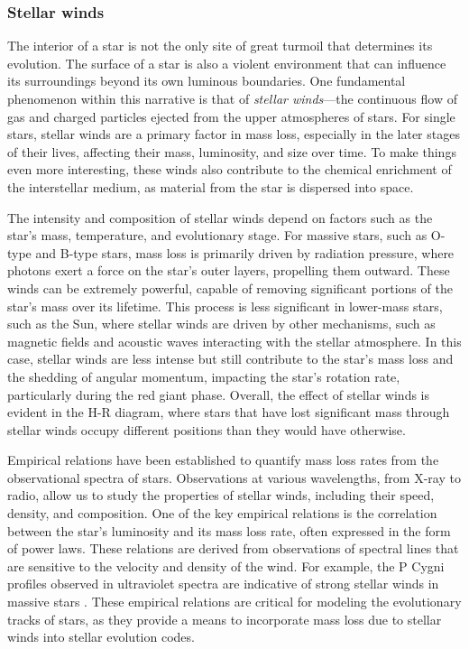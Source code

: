 \documentclass[main.tex]{subfiles}
\begin{document}
    \subsubsection{Stellar winds}
    The interior of a star is not the only site of great turmoil that determines its evolution. The surface of a star is also a violent environment that can influence its surroundings beyond its own luminous boundaries. One fundamental phenomenon within this narrative is that of \textit{stellar winds}---the continuous flow of gas and charged particles ejected from the upper atmospheres of stars. For single stars, stellar winds are a primary factor in mass loss, especially in the later stages of their lives, affecting their mass, luminosity, and size over time. To make things even more interesting, these winds also contribute to the chemical enrichment of the interstellar medium, as material from the star is dispersed into space.

    The intensity and composition of stellar winds depend on factors such as the star's mass, temperature, and evolutionary stage. For massive stars, such as O-type and B-type stars, mass loss is primarily driven by radiation pressure, where photons exert a force on the star's outer layers, propelling them outward. These winds can be extremely powerful, capable of removing significant portions of the star's mass over its lifetime.
    This process is less significant in lower-mass stars, such as the Sun, where stellar winds are driven by other mechanisms, such as magnetic fields and acoustic waves interacting with the stellar atmosphere. In this case, stellar winds are less intense but still contribute to the star's mass loss and the shedding of angular momentum, impacting the star's rotation rate, particularly during the red giant phase. Overall, the effect of stellar winds is evident in the H-R diagram, where stars that have lost significant mass through stellar winds occupy different positions than they would have otherwise.

    Empirical relations have been established to quantify mass loss rates from the observational spectra of stars. Observations at various wavelengths, from X-ray to radio, allow us to study the properties of stellar winds, including their speed, density, and composition. One of the key empirical relations is the correlation between the star's luminosity and its mass loss rate, often expressed in the form of power laws. These relations are derived from observations of spectral lines that are sensitive to the velocity and density of the wind. For example, the P Cygni profiles observed in ultraviolet spectra are indicative of strong stellar winds in massive stars \citep[e.g.,][]{israelian:ssr99}. These empirical relations are critical for modeling the evolutionary tracks of stars, as they provide a means to incorporate mass loss due to stellar winds into stellar evolution codes.
\end{document}
